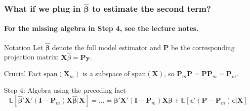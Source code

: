 \begin{frame}
  \frametitle{What if we plug in $\widehat{\boldsymbol{\beta}}$ to estimate the second term?}
  \framesubtitle{For the missing algebra in Step 4, see the lecture notes.}
  \begin{block}{Notation}
    Let $\widehat{\boldsymbol{\beta}}$ denote the full model estimator and $\mathbf{P}$ be the corresponding projection matrix: $\mathbf{X}\widehat{\beta} = \mathbf{P}\mathbf{y}$.
  \end{block}

  \pause

  \begin{alertblock}{Crucial Fact}
    $\text{span}(\mathbf{X}_m)$ is a subspace of $\text{span}(\mathbf{X})$, so $\mathbf{P}_m \mathbf{P} = \mathbf{P} \mathbf{P}_m = \mathbf{P}_m$.
  \end{alertblock}

  \pause

  \begin{block}{Step 4: Algebra using the preceding fact }
    \vspace{-1em}
   \[
     \mathbb{E}\left[ \widehat{\boldsymbol{\beta}}'\mathbf{X}'(\mathbf{I} - \mathbf{P}_m) \mathbf{X}\widehat{\boldsymbol{\beta}}|\mathbf{X}\right] = \dots = \boldsymbol{\beta}' \mathbf{X}' (\mathbf{I} - \mathbf{P}_m)\mathbf{X} \boldsymbol{\beta} + \mathbb{E}\left[ \boldsymbol{\epsilon}'(\mathbf{P} - \mathbf{P}_m)\boldsymbol{\epsilon} | \mathbf{X}\right]
   \]
  \end{block}
\end{frame}
